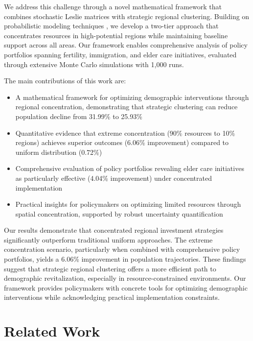 \documentclass{article} %
\begin{document}
We address this challenge through a novel mathematical framework that combines stochastic Leslie matrices with strategic regional clustering. Building on probabilistic modeling techniques \citep{ddpm,pmlr-v37-sohl-dickstein15}, we develop a two-tier approach that concentrates resources in high-potential regions while maintaining baseline support across all areas. Our framework enables comprehensive analysis of policy portfolios spanning fertility, immigration, and elder care initiatives, evaluated through extensive Monte Carlo simulations with 1,000 runs.

The main contributions of this work are:
\begin{itemize}
    \item A mathematical framework for optimizing demographic interventions through regional concentration, demonstrating that strategic clustering can reduce population decline from 31.99\% to 25.93\%
    \item Quantitative evidence that extreme concentration (90\% resources to 10\% regions) achieves superior outcomes (6.06\% improvement) compared to uniform distribution (0.72\%)
    \item Comprehensive evaluation of policy portfolios revealing elder care initiatives as particularly effective (4.04\% improvement) under concentrated implementation
    \item Practical insights for policymakers on optimizing limited resources through spatial concentration, supported by robust uncertainty quantification
\end{itemize}

Our results demonstrate that concentrated regional investment strategies significantly outperform traditional uniform approaches. The extreme concentration scenario, particularly when combined with comprehensive policy portfolios, yields a 6.06\% improvement in population trajectories. These findings suggest that strategic regional clustering offers a more efficient path to demographic revitalization, especially in resource-constrained environments. Our framework provides policymakers with concrete tools for optimizing demographic interventions while acknowledging practical implementation constraints.

\section{Related Work}
\label{sec:related}
\end{document}
